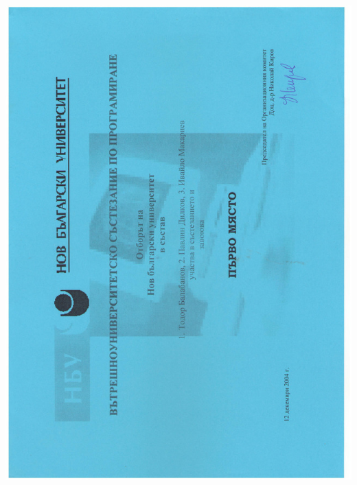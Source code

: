 \documentclass[english,a4paper]{europasscv}
\begin{document}
\includegraphics[width=\textwidth,height=\textheight,keepaspectratio]{NBU2004}
\end{document}
